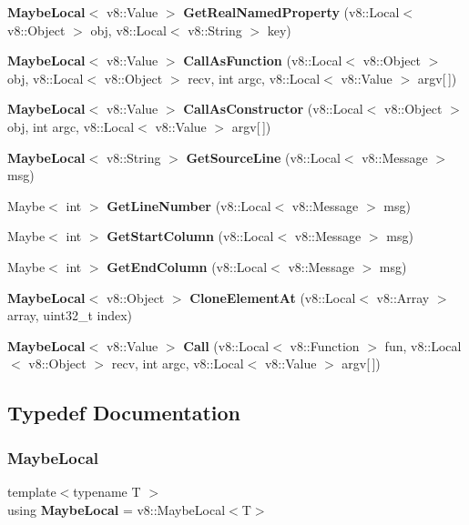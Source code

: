 \begin{DoxyCompactItemize}
\item 
\textbf{ Maybe\+Local}$<$ v8\+::\+Value $>$ \textbf{ Get\+Real\+Named\+Property} (v8\+::\+Local$<$ v8\+::\+Object $>$ obj, v8\+::\+Local$<$ v8\+::\+String $>$ key)
\item 
\textbf{ Maybe\+Local}$<$ v8\+::\+Value $>$ \textbf{ Call\+As\+Function} (v8\+::\+Local$<$ v8\+::\+Object $>$ obj, v8\+::\+Local$<$ v8\+::\+Object $>$ recv, int argc, v8\+::\+Local$<$ v8\+::\+Value $>$ argv[$\,$])
\item 
\textbf{ Maybe\+Local}$<$ v8\+::\+Value $>$ \textbf{ Call\+As\+Constructor} (v8\+::\+Local$<$ v8\+::\+Object $>$ obj, int argc, v8\+::\+Local$<$ v8\+::\+Value $>$ argv[$\,$])
\item 
\textbf{ Maybe\+Local}$<$ v8\+::\+String $>$ \textbf{ Get\+Source\+Line} (v8\+::\+Local$<$ v8\+::\+Message $>$ msg)
\item 
Maybe$<$ int $>$ \textbf{ Get\+Line\+Number} (v8\+::\+Local$<$ v8\+::\+Message $>$ msg)
\item 
Maybe$<$ int $>$ \textbf{ Get\+Start\+Column} (v8\+::\+Local$<$ v8\+::\+Message $>$ msg)
\item 
Maybe$<$ int $>$ \textbf{ Get\+End\+Column} (v8\+::\+Local$<$ v8\+::\+Message $>$ msg)
\item 
\textbf{ Maybe\+Local}$<$ v8\+::\+Object $>$ \textbf{ Clone\+Element\+At} (v8\+::\+Local$<$ v8\+::\+Array $>$ array, uint32\+\_\+t index)
\item 
\textbf{ Maybe\+Local}$<$ v8\+::\+Value $>$ \textbf{ Call} (v8\+::\+Local$<$ v8\+::\+Function $>$ fun, v8\+::\+Local$<$ v8\+::\+Object $>$ recv, int argc, v8\+::\+Local$<$ v8\+::\+Value $>$ argv[$\,$])
\end{DoxyCompactItemize}


\subsection{Typedef Documentation}
\mbox{\label{nan__maybe__43__inl_8h_a8ec12c0fbefbe0ad8893e7cbb3683787}} 
\subsubsection{Maybe\+Local}
{\footnotesize\ttfamily template$<$typename T $>$ \\
using \textbf{ Maybe\+Local} =  v8\+::\+Maybe\+Local$<$T$>$}



